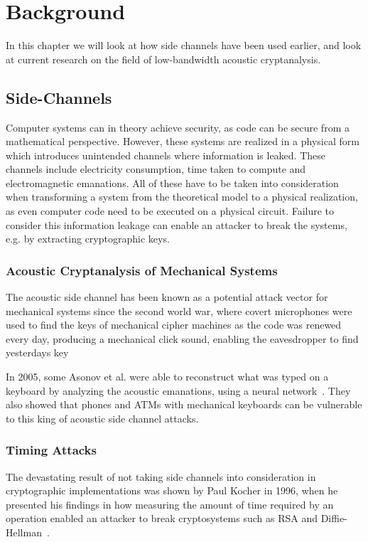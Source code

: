 \chapter{Background}\label{chp:background} 
In this chapter we will look at how side channels have been used earlier, and look at current research on the field of low-bandwidth acoustic cryptanalysis.


\section{Side-Channels}\label{chp2:sec:side_channel}
Computer systems can in theory achieve security, as code can be secure from a mathematical perspective.
However, these systems are realized in a physical form which introduces unintended channels where information is leaked.
These channels include electricity consumption, time taken to compute and electromagnetic emanations. 
All of these have to be taken into consideration when transforming a system from the theoretical model to a physical realization, as even computer code need to be executed on a physical circuit.
Failure to consider this information leakage can enable an attacker to break the systems, e.g. by extracting cryptographic keys.

\subsection{Acoustic Cryptanalysis of Mechanical Systems}\label{chp2:subsec:acoustic_cryptanalysis}
The acoustic side channel has been known as a potential attack vector for mechanical systems since the second world war, where covert microphones were used to find the keys of mechanical cipher machines as the code was renewed every day, producing a mechanical click sound, enabling the eavesdropper to find yesterdays key~\cite{wright1988spycatcher}

In 2005, some Asonov et al. were able to reconstruct what was typed on a keyboard by analyzing the acoustic emanations, using a neural network~\cite{DBLP:conf/sp/AsonovA04}. 
They also showed that phones and ATMs with mechanical keyboards can be vulnerable to this king of acoustic side channel attacks.

\subsection{Timing Attacks}\label{chp2:subsec:timing_attacks}
The devastating result of not taking side channels into consideration in cryptographic implementations was shown by Paul Kocher in 1996, when he presented his findings in how measuring the amount of time required by an operation enabled an attacker to break cryptosystems such as RSA and Diffie-Hellman~\cite{DBLP:conf/crypto/Kocher96}.

